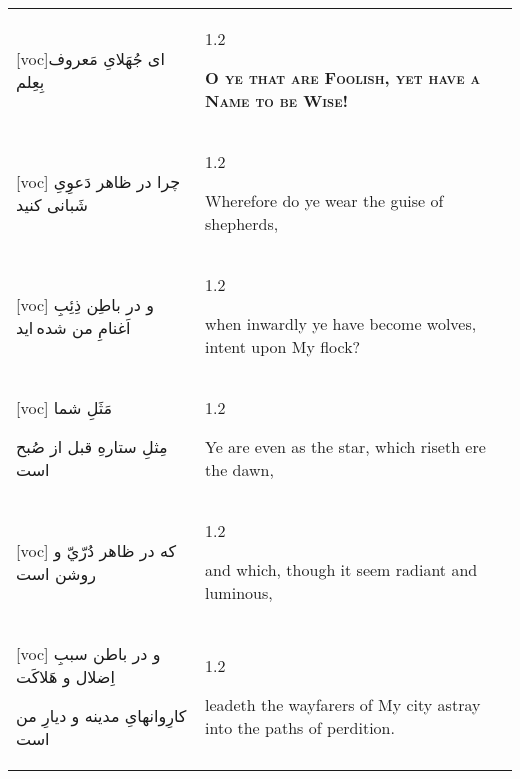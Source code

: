 \documentclass[11pt]{article}
\makeatletter
\newenvironment{orig}
  {\begin{farsi}[voc]}
  {\end{farsi}}
\newenvironment{trans}
  {\Large\begin{spacing}{1.2}\raggedright}
  {\end{spacing}}
\newenvironment{word}
  {\begin{tabular}[t]{p{2.75in}@{\hspace{3em}}p{2.75in}}}
  {\end{tabular}}
\newcommand{\ayat}[2]{\begin{orig}#1\end{orig} & \begin{trans}#2\end{trans}}
\newcommand{\heading}[2]{\textsc{\textbf{#1}} %
}
\makeatother
\begin{document}
\begin{word}
\ayat{ای جُهَلایِ مَعروف بِعِلم}{\heading{O ye that are Foolish, yet have a Name to be Wise!}{}} \\ \ayat{
چرا در ظاهر دَعوِیِ شَبانی کنيد
}{Wherefore do ye wear the guise of shepherds,} \vspace{-1ex}\\ \ayat{
و در باطِن ذِئِبِ اَغنامِ من شده ايد
}{when inwardly ye have become wolves, intent upon My flock?} \vspace{-1ex}\\ \ayat{
مَثَلِ شما

مِثلِ ستارهِ قبل از صُبح است
}{Ye are even as the star, which riseth ere the dawn,} \\ \ayat{
که در ظاهر دُرّيّ و روشن است
}{and which, though it seem radiant and luminous,} \vspace{-1ex}\\ \ayat{
و در باطن سببِ اِضلال و هَلاکَت

کارِوانهایِ مدينه و ديارِ من است
}{leadeth the wayfarers of My city astray into the paths of perdition.}
\end{word}




\end{document}
